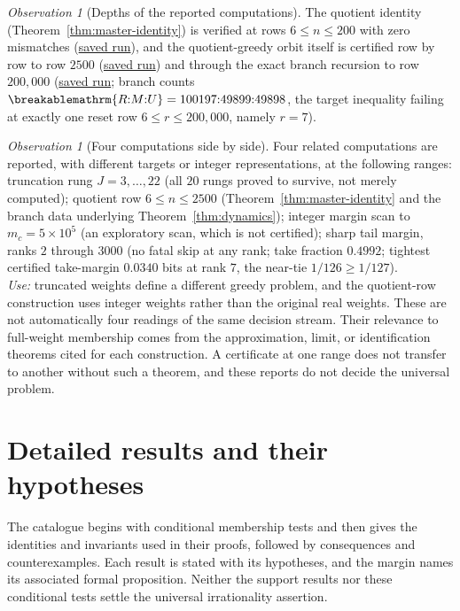 \documentclass[11pt]{article}
\theoremstyle{plain}
\theoremstyle{definition}
\theoremstyle{remark}
\newtheorem{obs}[thm]{Observation}
\renewcommand{\mathrm}[1]{\ifmmode\breakablemathrm{#1}\else\textrm{#1}\fi}%
\begin{document}
\begin{obs}[Depths of the reported computations]
\label{obs:anchors-depth}
The quotient identity (Theorem~\ref{thm:master-identity}) is verified at rows $6 \le n \le 200$ with zero
mismatches
(\href{https://github.com/wcook04/plectis-erdos/blob/f757115e03bebe5c04431a147da559015c680a37/research/experiments/erdos257/receipts/quotient-identity-200.json}{saved run}),
and the quotient-greedy orbit itself is certified row by row to row $2500$
(\href{https://github.com/wcook04/plectis-erdos/blob/f757115e03bebe5c04431a147da559015c680a37/research/experiments/erdos257/receipts/seam-reset-crossing-2500.json}{saved run})
and through the exact branch recursion to row $200{,}000$
(\href{https://github.com/wcook04/plectis-erdos/blob/f757115e03bebe5c04431a147da559015c680a37/research/experiments/erdos257/receipts/seam-orbit-200000.json}{saved run}; branch counts $\mathrm{R{:}M{:}U} =
100197{:}49899{:}49898$, the target inequality failing at exactly one reset row $6\le r\le 200{,}000$,
namely $r=7$).
\end{obs}

\begin{obs}[Four computations side by side]
\label{obs:anchors-coords}
Four related computations are reported, with different targets or
integer representations, at the following ranges: truncation rung $J = 3,\dots,22$ (all $20$ rungs proved to
survive, not merely computed); quotient row $6 \le n \le 2500$
(Theorem~\ref{thm:master-identity} and the branch data underlying
Theorem~\ref{thm:dynamics}); integer margin scan to $m_c = 5\times10^5$
(an exploratory scan, which is not certified); sharp tail margin, ranks $2$ through
$3000$ (no fatal skip at any rank; take fraction $0.4992$; tightest certified take-margin
$0.0340$ bits at rank $7$, the near-tie $1/126 \ge 1/127$).\\
\textit{Use:} truncated weights define a different greedy problem,
and the quotient-row construction uses integer weights rather than the
original real weights.  These are not automatically four readings of
the same decision stream.  Their relevance to full-weight membership
comes from the approximation, limit, or identification theorems cited
for each construction.  A certificate at one range does not transfer
to another without such a theorem, and these reports do not decide the
universal problem.
\end{obs}

\section{Detailed results and their hypotheses}
The catalogue begins with conditional membership tests and then gives
the identities and invariants used in their proofs, followed by
consequences and counterexamples. Each result is stated with its
hypotheses, and the margin names its associated formal proposition.
Neither the support results nor these conditional tests settle the
universal irrationality assertion.
\end{document}
